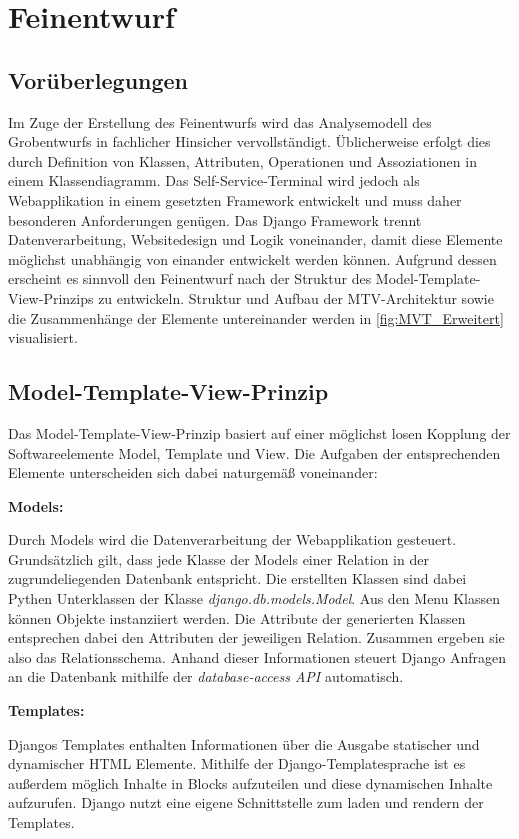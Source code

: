 \section{Feinentwurf}
\subsection{Vorüberlegungen}
Im Zuge der Erstellung des Feinentwurfs wird das Analysemodell des Grobentwurfs in fachlicher Hinsicher vervollständigt. Üblicherweise erfolgt dies durch Definition von Klassen, Attributen, Operationen und Assoziationen in einem Klassendiagramm. Das Self-Service-Terminal wird jedoch als Webapplikation in einem gesetzten Framework entwickelt und muss daher besonderen Anforderungen genügen.
Das Django Framework trennt Datenverarbeitung, Websitedesign und Logik voneinander, damit diese Elemente möglichst unabhängig von einander entwickelt werden können. Aufgrund dessen erscheint es sinnvoll den Feinentwurf nach der Struktur des Model-Template-View-Prinzips zu entwickeln. Struktur und Aufbau der MTV-Architektur sowie die Zusammenhänge der Elemente untereinander werden in \ref{fig:MVT_Erweitert} visualisiert.

\subsection{Model-Template-View-Prinzip}
Das Model-Template-View-Prinzip basiert auf einer möglichst losen Kopplung der Softwareelemente Model, Template und View. Die Aufgaben der entsprechenden Elemente unterscheiden sich dabei naturgemäß voneinander:\par 
\vspace{0,5cm}
\noindent \textbf{Models:} \par
\vspace{0,5cm}
\noindent Durch Models wird die Datenverarbeitung der Webapplikation gesteuert. Grundsätzlich gilt, dass jede Klasse der Models einer Relation in der zugrundeliegenden Datenbank entspricht. Die erstellten Klassen sind dabei Pythen Unterklassen der Klasse \textit{django.db.models.Model}. Aus den Menu Klassen können Objekte instanziiert werden. Die Attribute der generierten Klassen entsprechen dabei den Attributen der jeweiligen Relation. Zusammen ergeben sie also das Relationsschema. Anhand dieser Informationen steuert Django Anfragen an die Datenbank mithilfe der \textit{database-access API} automatisch.\par
\vspace{0,5cm}
\noindent \textbf{Templates:}\par
\vspace{0,5cm}
\noindent Djangos Templates enthalten Informationen über die Ausgabe statischer und dynamischer HTML Elemente. Mithilfe der Django-Templatesprache ist es außerdem möglich Inhalte in Blocks aufzuteilen und diese dynamischen Inhalte aufzurufen. Django nutzt eine eigene Schnittstelle zum laden und rendern der Templates.

